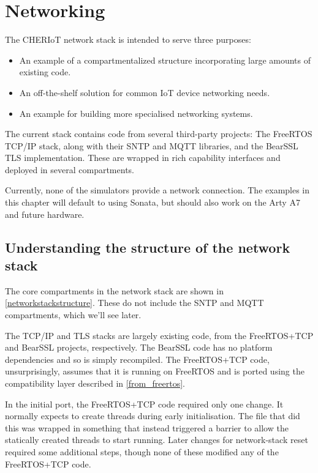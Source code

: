 \chapter{Networking}

The CHERIoT network stack is intended to serve three purposes:

\begin{itemize}
	\item{An example of a compartmentalized structure incorporating large amounts of existing code.}
	\item{An off-the-shelf solution for common IoT device networking needs.}
	\item{An example for building more specialised networking systems.}
\end{itemize}

The current stack contains code from several third-party projects: The FreeRTOS TCP/IP stack, along with their SNTP and MQTT libraries, and the BearSSL TLS implementation.
These are wrapped in rich capability interfaces and deployed in several compartments.

\begin{note}
Currently, none of the simulators provide a network connection.
The examples in this chapter will default to using Sonata, but should also work on the Arty A7 and future hardware.
\end{note}

\section{Understanding the structure of the network stack}

The core compartments in the network stack are shown in \ref{networkstackstructure}.
These do not include the SNTP and MQTT compartments, which we'll see later.


The TCP/IP and TLS stacks are largely existing code, from the FreeRTOS+TCP and BearSSL projects, respectively.
The BearSSL code has no platform dependencies and so is simply recompiled.
The FreeRTOS+TCP code, unsurprisingly, assumes that it is running on FreeRTOS and is ported using the compatibility layer described in \ref{from_freertos}.

In the initial port, the FreeRTOS+TCP code required only one change.
It normally expects to create threads during early initialisation.
The file that did this was wrapped in something that instead triggered a barrier to allow the statically created threads to start running.
Later changes for network-stack reset required some additional steps, though none of these modified any of the FreeRTOS+TCP code.

